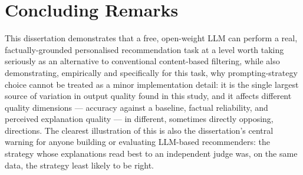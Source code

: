 \section{Concluding Remarks}

This dissertation demonstrates that a free, open-weight LLM can perform a real, factually-grounded personalised recommendation task at a level worth taking seriously as an alternative to conventional content-based filtering, while also demonstrating, empirically and specifically for this task, why prompting-strategy choice cannot be treated as a minor implementation detail: it is the single largest source of variation in output quality found in this study, and it affects different quality dimensions --- accuracy against a baseline, factual reliability, and perceived explanation quality --- in different, sometimes directly opposing, directions. The clearest illustration of this is also the dissertation's central warning for anyone building or evaluating LLM-based recommenders: the strategy whose explanations read best to an independent judge was, on the same data, the strategy least likely to be right.
